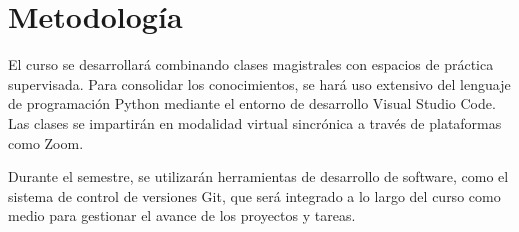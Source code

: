 \section{Metodología}

El curso se desarrollará combinando clases magistrales con espacios de práctica supervisada.
Para consolidar los conocimientos, se hará uso extensivo del lenguaje de programación Python mediante el entorno de desarrollo Visual Studio Code.
Las clases se impartirán en modalidad virtual sincrónica a través de plataformas como Zoom.

Durante el semestre, se utilizarán herramientas de desarrollo de software, como el sistema de control de versiones Git, que será integrado a lo largo del curso como medio para gestionar el avance de los proyectos y tareas.

